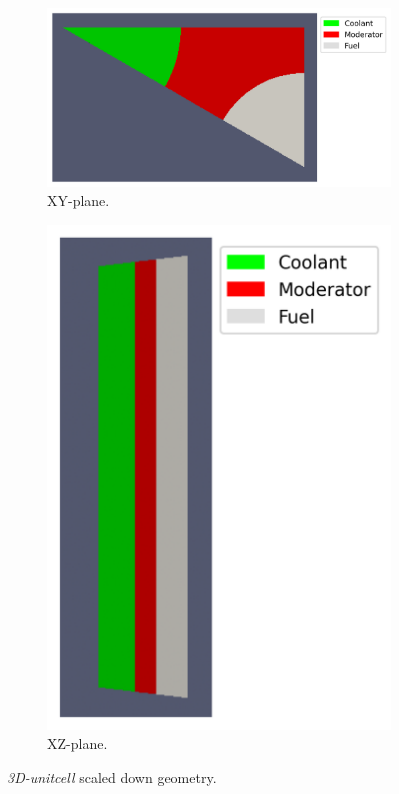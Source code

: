 \documentclass[11pt,letterpaper]{article}
\begin{document}
	\begin{figure}[htbp!]
		\centering
		\begin{subfigure}[t]{0.4\textwidth}
			\centering
			\includegraphics[width=\linewidth]{3D-unitcell-mesh1}
			\caption{XY-plane.}
		\end{subfigure}
		\begin{subfigure}[t]{0.4\textwidth}
			\centering
			\includegraphics[width=\linewidth]{3D-unitcell-mesh2}
			\caption{XZ-plane.}
		\end{subfigure}
		\hfill
		\caption{\textit{3D-unitcell} scaled down geometry.}
		\label{fig:3D-unitcell}
	\end{figure}
\end{document}
